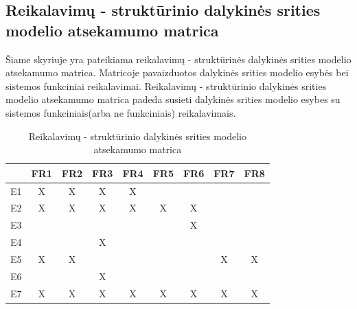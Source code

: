 \documentclass{VUMIFPSkursinis}
\begin{document}
            \subsection{Reikalavimų - struktūrinio dalykinės srities modelio atsekamumo matrica}
            Šiame skyriuje yra pateikiama reikalavimų - struktūrinės dalykinės srities modelio atsekamumo matrica. Matricoje pavaizduotos dalykinės srities modelio esybės bei sistemos funkciniai reikalavimai. Reikalavimų - struktūrinio dalykinės srities modelio atsekamumo matrica padeda susieti dalykinės srities modelio esybes su sistemos funkciniais(arba ne funkciniais) reikalavimais.
            \begin{table}[H]\footnotesize
                \centering
                \caption{Reikalavimų - struktūrinio dalykinės srities modelio atsekamumo matrica}
                {
                    \begin{tabular}{|c|c|c|c|c|c|c|c|c| }
                    \hline
                          & FR1  & FR2 & FR3 & FR4 & FR5 & FR6 & FR7 & FR8 \\ 
                    \hline
                        E1 & X   & X   & X   & X   &     &     &     &      \\  
                    \hline
                        E2 & X   & X   & X   & X   & X   & X   &     &      \\ 
                    \hline
                        E3 &     &     &     &     &     & X   &     &      \\ 
                    \hline
                        E4 &     &     & X   &     &     &     &     &      \\ 
                    \hline
                        E5 & X   & X   &     &     &     &     & X   & X    \\ 
                    \hline
                        E6 &     &     & X   &     &     &     &     &      \\ 
                    \hline
                        E7 & X   & X   & X   & X   & X   & X   & X   & X    \\ 
                    \hline 
                    \end{tabular}
                }
            \end{table}
      
\end{document}
